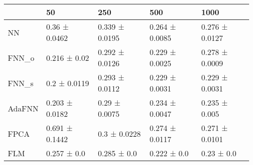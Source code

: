 \begin{tabular}{lllll}
\toprule
 & 50 & 250 & 500 & 1000 \\
\midrule
NN & 0.36 ± 0.0462 & 0.339 ± 0.0195 & 0.264 ± 0.0085 & 0.276 ± 0.0127 \\
FNN_o & 0.216 ± 0.02 & 0.292 ± 0.0126 & 0.229 ± 0.0025 & 0.278 ± 0.0009 \\
FNN_s & 0.2 ± 0.0119 & 0.293 ± 0.0112 & 0.229 ± 0.0031 & 0.229 ± 0.0031 \\
AdaFNN & 0.203 ± 0.0182 & 0.29 ± 0.0075 & 0.234 ± 0.0047 & 0.235 ± 0.005 \\
FPCA & 0.691 ± 0.1442 & 0.3 ± 0.0228 & 0.274 ± 0.0117 & 0.271 ± 0.0101 \\
FLM & 0.257 ± 0.0 & 0.285 ± 0.0 & 0.222 ± 0.0 & 0.23 ± 0.0 \\
\bottomrule
\end{tabular}
